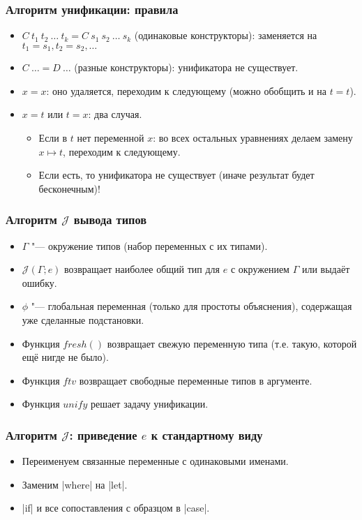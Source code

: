 \documentclass[11pt]{beamer}
\begin{document}
\begin{frame}[fragile]
  \frametitle{Алгоритм унификации: правила}
  \begin{itemize}
    \item $C~t_1~t_2~\ldots~t_k = C~s_1~s_2~\ldots~s_k$ (одинаковые конструкторы): \pause заменяется на $t_1 = s_1, t_2 = s_2, \ldots$
          \pause
    \item $C~\ldots = D~\ldots$ (разные конструкторы): \pause унификатора не существует.
          \pause
    \item $x=x$: \pause оно удаляется, переходим к следующему (можно обобщить и на $t=t$).
          \pause
    \item $x=t$ или $t=x$: два случая. \pause
          \begin{itemize}
            \item Если в $t$ нет переменной $x$: \pause во всех остальных уравнениях делаем замену $x \mapsto t$, переходим к следующему.
            \item Если есть\pause, то унификатора не существует (иначе результат будет бесконечным)!
          \end{itemize}
  \end{itemize}
\end{frame}

\newcommand{\fresh}{\mathord{\mathit{fresh}}()}
\newcommand{\J}{\mathcal{J}}
\begin{frame}[fragile]
  \frametitle{Алгоритм $\J$ вывода типов}
  \begin{itemize}
    \item $\Gamma$ "--- окружение типов (набор переменных с их типами).
    \item $\J(\Gamma; e)$ возвращает наиболее общий тип для $e$ с окружением $\Gamma$ или выдаёт ошибку.
          \pause
          \vspace{1em}
    \item $\phi$ "--- глобальная переменная (только для простоты объяснения), содержащая уже сделанные подстановки.
    \item Функция $\fresh$ возвращает свежую переменную типа (т.е. такую, которой ещё нигде не было).
    \item Функция $ftv$ возвращает свободные переменные типов в аргументе.
    \item Функция $unify$ решает задачу унификации.
  \end{itemize}
\end{frame}

\begin{frame}[fragile]
  \frametitle{Алгоритм $\J$: приведение $e$ к стандартному виду}
  \begin{itemize}
    \item Переименуем связанные переменные с одинаковыми именами.
    \item Заменим \haskinline|where| на \haskinline|let|.
    \item \haskinline|if| и все сопоставления с образцом в \haskinline|case|.
  \end{itemize}
\end{frame}
\end{document}
